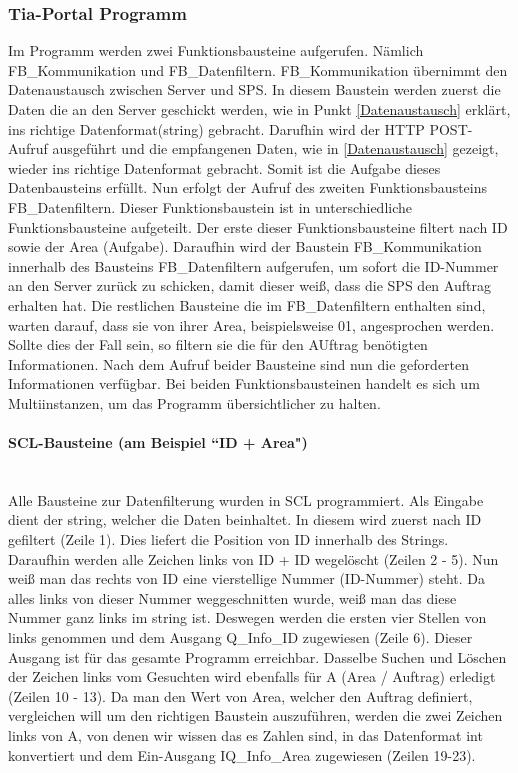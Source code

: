     \subsubsection{Tia-Portal Programm}
    Im Programm werden zwei Funktionsbausteine aufgerufen. Nämlich FB\_Kommunikation und FB\_Datenfiltern. FB\_Kommunikation übernimmt den Datenaustausch zwischen Server und SPS. In diesem Baustein werden zuerst die Daten die an den Server geschickt werden, wie in Punkt \ref{Datenaustausch} erklärt, ins richtige Datenformat(string) gebracht. Darufhin wird der HTTP POST-Aufruf ausgeführt und die empfangenen Daten, wie in \ref{Datenaustausch} gezeigt, wieder ins richtige Datenformat gebracht. Somit ist die Aufgabe dieses Datenbausteins erfüllt. Nun erfolgt der Aufruf des zweiten Funktionsbausteins FB\_Datenfiltern. Dieser Funktionsbaustein ist in unterschiedliche Funktionsbausteine aufgeteilt. Der erste dieser Funktionsbausteine filtert nach ID sowie der Area (Aufgabe). Daraufhin wird der Baustein FB\_Kommunikation innerhalb des Bausteins FB\_Datenfiltern aufgerufen, um sofort die ID-Nummer an den Server zurück zu schicken, damit dieser weiß, dass die SPS den Auftrag erhalten hat. Die restlichen Bausteine die im FB\_Datenfiltern enthalten sind, warten darauf, dass sie von ihrer Area, beispielsweise 01, angesprochen werden. Sollte dies der Fall sein, so filtern sie die für den AUftrag benötigten Informationen. Nach dem Aufruf beider Bausteine sind nun die geforderten Informationen verfügbar. Bei beiden Funktionsbausteinen handelt es sich um Multiinstanzen, um das Programm übersichtlicher zu halten. 

    \paragraph{SCL-Bausteine (am Beispiel ``ID + Area")} 
    \mbox{} \\
    Alle Bausteine zur Datenfilterung wurden in SCL programmiert. Als Eingabe dient der string, welcher die Daten beinhaltet. In diesem wird zuerst nach ID gefiltert (Zeile 1). Dies liefert die Position von ID innerhalb des Strings. Daraufhin werden alle Zeichen links von ID + ID wegelöscht (Zeilen 2 - 5). Nun weiß man das rechts von ID eine vierstellige Nummer (ID-Nummer) steht. Da alles links von dieser Nummer weggeschnitten wurde, weiß man das diese Nummer ganz links im string ist. Deswegen werden die ersten vier Stellen von links genommen und dem Ausgang Q\_Info\_ID zugewiesen (Zeile 6). Dieser Ausgang ist für das gesamte Programm erreichbar. Dasselbe Suchen und Löschen der Zeichen links vom Gesuchten wird ebenfalls für A (Area / Auftrag) erledigt (Zeilen 10 - 13). Da man den Wert von Area, welcher den Auftrag definiert, vergleichen will um den richtigen Baustein auszuführen, werden die zwei Zeichen links von A, von denen wir wissen das es Zahlen sind, in das Datenformat int konvertiert und dem Ein-Ausgang IQ\_Info\_Area zugewiesen (Zeilen 19-23). \\

